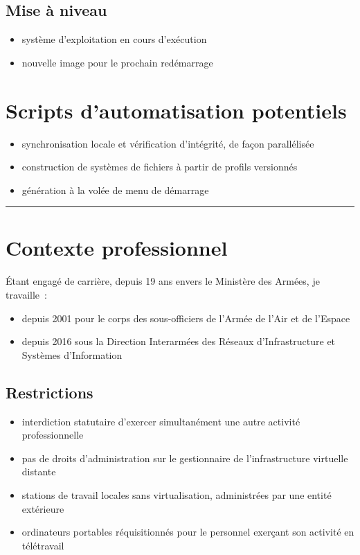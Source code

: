 \documentclass[10pt]{article}
\newcommand{\hr}{\rule{\textwidth}{1pt}}
\newenvironment{itmz}{\begin{itemize}
\setlength{\itemsep}{0em}
}{\end{itemize}}
\begin{document}
\subsection{Mise à niveau}

\begin{itmz}
\item{système d’exploitation en cours d’exécution}
\item{nouvelle image pour le prochain redémarrage}
\end{itmz}

\section{Scripts d’automatisation potentiels}

\begin{itmz}
\item{synchronisation locale et vérification d’intégrité, de façon parallélisée}
\item{construction de systèmes de fichiers à partir de profils versionnés}
\item{génération à la volée de menu de démarrage}
\end{itmz}

\hr

\appendix

\section{Contexte professionnel}

Étant engagé de carrière, depuis 19 ans envers le Ministère des Armées, je travaille :
\begin{itmz}
\item{depuis 2001 pour le corps des sous-officiers de l’Armée de l’Air et de l’Espace}
\item{depuis 2016 sous la Direction Interarmées des Réseaux d’Infrastructure et Systèmes d’Information}
\end{itmz}

\subsection{Restrictions}

\begin{itmz}
\item{interdiction statutaire d’exercer simultanément une autre activité professionnelle}
\item{pas de droits d’administration sur le gestionnaire de l’infrastructure virtuelle distante}
\item{stations de travail locales sans virtualisation, administrées par une entité extérieure}
\item{ordinateurs portables réquisitionnés pour le personnel exerçant son activité en télétravail}
\end{itmz}
\end{document}

